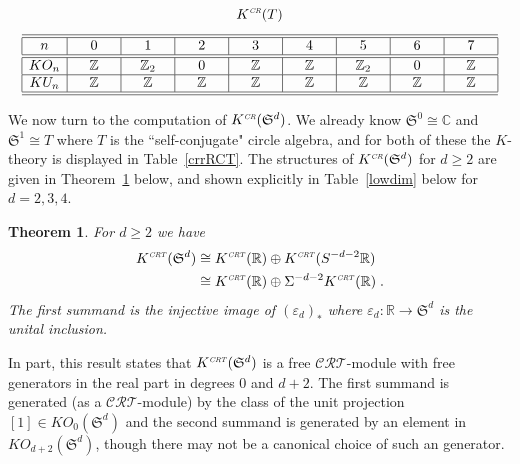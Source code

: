 \documentclass[12pt, reqno]{amsart}
\newtheorem{thm}{Theorem}[section]
\theoremstyle{definition}
\def\ve{\varepsilon}
\def\R{{\mathbb R}}
\def\C{{\mathbb C}}
\def\Z{{\mathbb Z}}
\def\crr{^{\scriptscriptstyle {\it CR}}}
\def\crt{^{\scriptscriptstyle {\it CRT}}}
\newcommand{\fS}{\mathfrak S}
\begin{document}
\begin{table}[h]
$$K\crr(T)$$
\[ \begin{array}{|c|c|c|c|c|c|c|c|c|c|}  
\hline  \hline 
n & \makebox[1cm][c]{0} & \makebox[1cm][c]{1} & 
\makebox[1cm][c]{2} & \makebox[1cm][c]{3} 
& \makebox[1cm][c]{4} & \makebox[1cm][c]{5} 
& \makebox[1cm][c]{6} & \makebox[1cm][c]{7}  \\
\hline  \hline
KO_n 
& \Z & \Z_2& 0 & \Z & \Z & \Z_2& 0 & \Z  \\
\hline  
KU_n 
& \Z & \Z  & \Z & \Z & \Z & \Z & \Z & \Z \\
\hline \hline
\end{array} \]
\end{table}

We now turn to the computation of $K\crr(\fS^d)$. We already know $\fS^0 \cong \C$ and $\fS^1 \cong T$ where $T$ is the ``self-conjugate" circle algebra, and for both of these the $K$-theory is displayed in Table~\ref{crrRCT}. The structures of $K\crr(\fS^d)$ for $d \geq 2$ are given in Theorem~\ref{fS^d} below, and shown explicitly in Table~\ref{lowdim} below for $d = 2,3,4$. 

\begin{thm} \label{fS^d} 
For $d \geq 2$ we have
\begin{align*} K\crt( \fS^d) &\cong
	 K\crt(\R) \oplus K\crt(S ^{-d-2} \R) \\
	 &\cong  K\crt(\R) \oplus \Sigma^{-d-2} K\crt(\R) \; . \end{align*}
The first summand is the injective image of $(\ve_d)_*$ where $\ve_d \colon \R \rightarrow \fS^d$ is the unital inclusion.
\end{thm}

In part, this result states that $K\crt(\fS^d)$ is a free $\mathcal{CRT}$-module with free generators in the real part in degrees 0 and $d+2$.
The first summand is generated (as a $\mathcal{CRT}$-module) by the class of the unit projection $[1] \in KO_0(\fS^d)$ and the second summand is generated by an element in $KO_{d+2}(\fS^d)$, though there may not be a canonical choice of such an generator.
\end{document}
